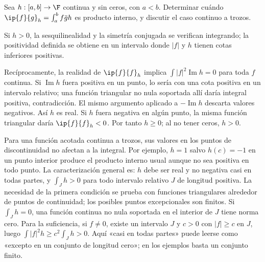 \begin{ejercicio}
Sea $h:[a,b]\to\F$ continua y sin ceros, con $a<b$. Determinar cuándo $\ip{f}{g}_h=\int_a^b f\bar g h$ es producto interno, y discutir el caso continuo a trozos.
\end{ejercicio}
\begin{solucion}
Si $h>0$, la sesquilinealidad y la simetría conjugada se verifican integrando; la positividad definida se obtiene en un intervalo donde $|f|$ y $h$ tienen cotas inferiores positivas.

Recíprocamente, la realidad de $\ip{f}{f}_h$ implica $\int|f|^{2}\operatorname{Im}h=0$ para toda $f$ continua. Si $\operatorname{Im}h$ fuera positiva en un punto, lo sería con una cota positiva en un intervalo relativo; una función triangular no nula soportada allí daría integral positiva, contradicción. El mismo argumento aplicado a $-\operatorname{Im}h$ descarta valores negativos. Así $h$ es real. Si $h$ fuera negativa en algún punto, la misma función triangular daría $\ip{f}{f}_h<0$. Por tanto $h\geq0$; al no tener ceros, $h>0$.

Para una función acotada continua a trozos, sus valores en los puntos de discontinuidad no afectan a la integral. Por ejemplo, $h=1$ salvo $h(c)=-1$ en un punto interior produce el producto interno usual aunque no sea positiva en todo punto. La caracterización general es: $h$ debe ser real y no negativa casi en todas partes, y $\int_J h>0$ para todo intervalo relativo $J$ de longitud positiva. La necesidad de la primera condición se prueba con funciones triangulares alrededor de puntos de continuidad; los posibles puntos excepcionales son finitos. Si $\int_Jh=0$, una función continua no nula soportada en el interior de $J$ tiene norma cero. Para la suficiencia, si $f\ne0$, existe un intervalo $J$ y $c>0$ con $|f|\geq c$ en $J$, luego $\int|f|^{2}h\geq c^{2}\int_Jh>0$. Aquí «casi en todas partes» puede leerse como «excepto en un conjunto de longitud cero»; en los ejemplos basta un conjunto finito.
\end{solucion}

